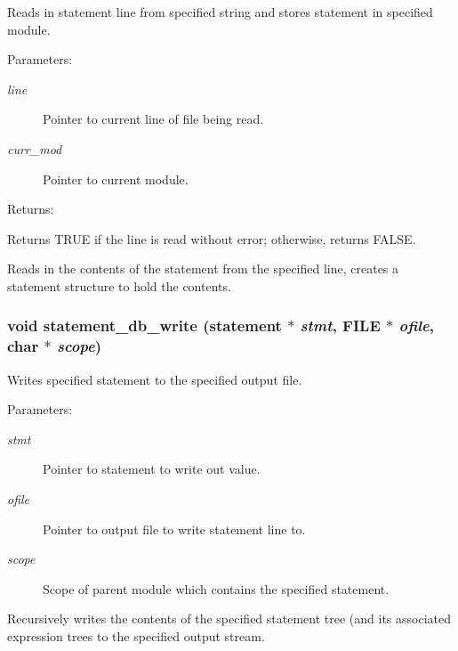 Reads in statement line from specified string and stores statement in specified module.

\begin{Desc}
\item[Parameters: ]\par
\begin{description}
\item[{\em 
line}]Pointer to current line of file being read. \item[{\em 
curr\_\-mod}]Pointer to current module.\end{description}
\end{Desc}
\begin{Desc}
\item[Returns: ]\par
Returns TRUE if the line is read without error; otherwise, returns FALSE.\end{Desc}
Reads in the contents of the statement from the specified line, creates a statement structure to hold the contents. 
\subsubsection{\setlength{\rightskip}{0pt plus 5cm}void statement\_\-db\_\-write ({\bf statement} $\ast$ {\em stmt}, FILE $\ast$ {\em ofile}, char $\ast$ {\em scope})}\label{statement_8c_a1}


Writes specified statement to the specified output file.

\begin{Desc}
\item[Parameters: ]\par
\begin{description}
\item[{\em 
stmt}]Pointer to statement to write out value. \item[{\em 
ofile}]Pointer to output file to write statement line to. \item[{\em 
scope}]Scope of parent module which contains the specified statement.\end{description}
\end{Desc}
Recursively writes the contents of the specified statement tree (and its associated expression trees to the specified output stream. 
